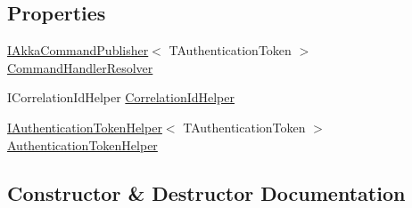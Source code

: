 \subsection*{Properties}
\begin{DoxyCompactItemize}
\item 
\hyperlink{interfaceCqrs_1_1Akka_1_1Commands_1_1IAkkaCommandPublisher}{I\+Akka\+Command\+Publisher}$<$ T\+Authentication\+Token $>$ \hyperlink{classCqrs_1_1Akka_1_1Commands_1_1AkkaCommandBusProxy_1_1BusActor_a097e43f25d55e632c2c5da9d0255d180_a097e43f25d55e632c2c5da9d0255d180}{Command\+Handler\+Resolver}
\item 
I\+Correlation\+Id\+Helper \hyperlink{classCqrs_1_1Akka_1_1Commands_1_1AkkaCommandBusProxy_1_1BusActor_ab353a9b434004f9b0637dd5dbe4402ac_ab353a9b434004f9b0637dd5dbe4402ac}{Correlation\+Id\+Helper}
\item 
\hyperlink{interfaceCqrs_1_1Authentication_1_1IAuthenticationTokenHelper}{I\+Authentication\+Token\+Helper}$<$ T\+Authentication\+Token $>$ \hyperlink{classCqrs_1_1Akka_1_1Commands_1_1AkkaCommandBusProxy_1_1BusActor_a10dd32ee768f6ccf93aa0e04472c84b6_a10dd32ee768f6ccf93aa0e04472c84b6}{Authentication\+Token\+Helper}
\end{DoxyCompactItemize}


\subsection{Constructor \& Destructor Documentation}
\mbox{\label{classCqrs_1_1Akka_1_1Commands_1_1AkkaCommandBusProxy_1_1BusActor_a5ddecec1b6333aaf89dbff824cf6ddd2_a5ddecec1b6333aaf89dbff824cf6ddd2}} 
